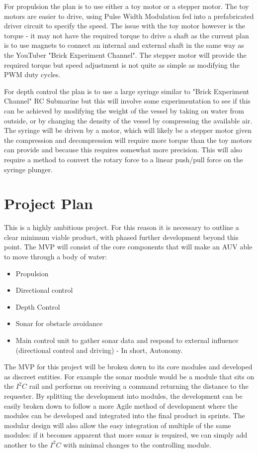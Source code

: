 \documentclass[11pt,a4paper,titlepage]{report}
\begin{document}
	For propulsion the plan is to use either a toy motor or a stepper motor. The toy motors are easier to drive, using Pulse Width Modulation fed into a prefabricated driver circuit to specify the speed. The issue with the toy motor however is the torque - it may not have the required torque to drive a shaft as the current plan is to use magnets to connect an internal and external shaft in the same way as the YouTuber "Brick Experiment Channel"\cite{BRICK_EXPERIMENT_CHANNEL_BLOG}. The stepper motor will provide the required torque but speed adjustment is not quite as simple as modifying the PWM duty cycles.
	
	For depth control the plan is to use a large syringe similar to "Brick Experiment Channel" RC Submarine but this will involve some experimentation to see if this can be achieved by modifying the weight of the vessel by taking on water from outside, or by changing the density of the vessel by compressing the available air. The syringe will be driven by a motor, which will likely be a stepper motor given the compression and decompression will require more torque than the toy motors can provide and because this requires somewhat more precision. This will also require a method to convert the rotary force to a linear push/pull force on the syringe plunger. 
	
	
	\section*{Project Plan}
	
	This is a highly ambitious project. For this reason it is necessary to outline a clear minimum viable product, with phased further development beyond this point. The MVP will consist of the core components that will make an AUV able to move through a body of water:
	
	\begin{itemize}
		\item Propulsion
		\item Directional control
		\item Depth Control
		\item Sonar for obstacle avoidance
		\item Main control unit to gather sonar data and respond to external influence (directional control and driving) - In short, Autonomy.
	\end{itemize}
	
	The MVP for this project will be broken down to its core modules and developed as discreet entities. For example the sonar module would be a module that sits on the $I^{2}C$ rail and performs on receiving a command returning the distance to the requester. By splitting the development into modules, the development can be easily broken down to follow a more Agile method of development where the modules can be developed and integrated into the final product in sprints. The modular design will also allow the easy integration of multiple of the same modules: if it becomes apparent that more sonar is required, we can simply add another to the $I^{2}C$ with minimal changes to the controlling module. 
	
\end{document}
